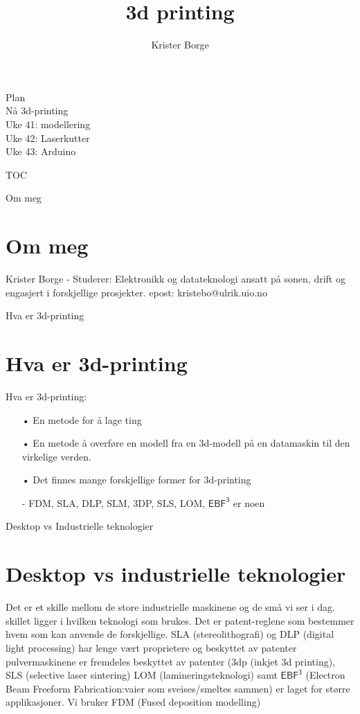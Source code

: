 \documentclass[12pt]{beamer}
\author{Krister Borge}
\title{3d printing}
\institute{Institutt for informatikk}
\date{}
\begin{document}
\begin{frame}
\titlepage
\end{frame}

\begin{frame}
\large{Plan}\\
\small{Nå 3d-printing\\
Uke 41: modellering\\
Uke 42: Laserkutter\\
Uke 43: Arduino\\}
\end{frame}
\begin{frame}{TOC}
\tableofcontents
\end{frame}

\begin{frame}{Om meg}
\section{Om meg}
	Krister Borge - 
	Studerer: Elektronikk og datateknologi
	ansatt på sonen, drift og engasjert i forskjellige prosjekter.
	epost: kristebo@ulrik.uio.no
\end{frame}

\begin{frame}{Hva er 3d-printing}
\section{Hva er 3d-printing}
Hva er 3d-printing:
\begin{enumerate}
\item[•] En metode for å lage ting
\item[•] En metode å overføre en modell fra en 3d-modell på en datamaskin til den virkelige verden.
\item[•] Det finnes mange forskjellige former for 3d-printing
\item[-] FDM, SLA, DLP, SLM, 3DP, SLS, LOM, $\mathsf{EBF^3}$ er noen
\end{enumerate}
\end{frame}

\begin{frame}{Desktop vs Industrielle teknologier}
\section{Desktop vs industrielle teknologier}
Det er et skille mellom de store industrielle maskinene og de små vi ser i dag. skillet ligger i hvilken teknologi som brukes. Det er patent-reglene som bestemmer hvem som kan anvende de forskjellige.
SLA (stereolithografi) og DLP (digital light processing) har lenge vært proprietere og beskyttet av patenter
pulvermaskinene er fremdeles beskyttet av patenter (3dp (inkjet 3d printing), SLS (selective laser sintering) %
LOM (lamineringsteknologi) samt $\mathsf{EBF^3}$ (Electron Beam Freeform Fabrication:vaier som sveises/smeltes sammen) er laget for større applikasjoner. 
Vi bruker FDM (Fused deposition modelling)
 
\end{frame}
\end{document}
